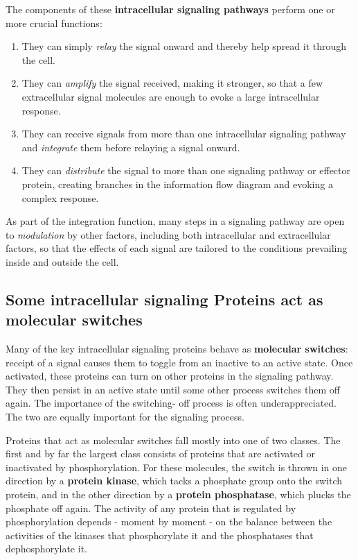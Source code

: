 The components of these \textbf{intracellular signaling pathways} perform one
or more crucial functions:

\begin{enumerate}
\item They can simply \textit{relay} the signal onward and thereby help spread it
through the cell.
\item They can \textit{amplify} the signal received, making it stronger, so that
a few extracellular signal molecules are enough to evoke a large
intracellular response.
\item They can receive signals from more than one intracellular signaling
pathway and \textit{integrate} them before relaying a signal onward.
\item They can \textit{distribute} the signal to more than one signaling pathway or
effector protein, creating branches in the information flow diagram
and evoking a complex response.
\end{enumerate}

As part of the integration function, many steps in a signaling pathway
are open to \textit{modulation} by other factors, including both intracellular and
extracellular factors, so that the effects of each signal are tailored to the
conditions prevailing inside and outside the cell.

\subsection{Some intracellular signaling Proteins act as molecular switches}

Many of the key intracellular signaling proteins behave as \textbf{molecular
switches}: receipt of a signal causes them to toggle from an inactive to
an active state. Once activated, these proteins can turn on other proteins
in the signaling pathway. They then persist in an active state until some
other process switches them off again. The importance of the switching-
off process is often underappreciated. The two are equally important for the
signaling process.

Proteins that act as molecular switches fall mostly into one of two classes.
The first and by far the largest class consists of proteins that are activated
or inactivated by phosphorylation. For these molecules, the switch is thrown in
one direction by a \textbf{protein kinase}, which tacks a phosphate group onto
the switch protein, and in the other direction by a \textbf{protein phosphatase},
which plucks the phosphate off again. The activity of any protein that is regulated
by phosphorylation depends - moment by moment - on the balance between the activities
of the kinases that phosphorylate it and the phosphatases that dephosphorylate it.

